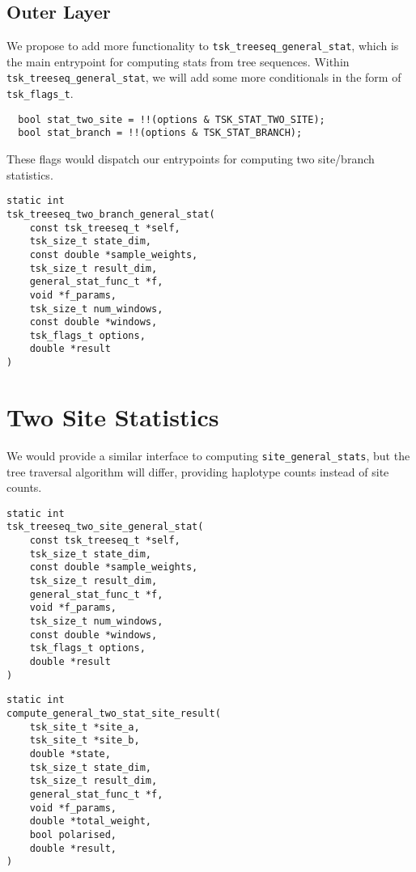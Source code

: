\documentclass[12pt]{article}
\begin{document}
\subsection{Outer Layer}

We propose to add more functionality to
\texttt{tsk_treeseq_general_stat}, which is the main entrypoint for
computing stats from tree sequences. Within
\texttt{tsk_treeseq_general_stat}, we will add some more conditionals in
the form of \texttt{tsk_flags_t}.

\begin{verbatim}
  bool stat_two_site = !!(options & TSK_STAT_TWO_SITE);
  bool stat_branch = !!(options & TSK_STAT_BRANCH);
\end{verbatim}

These flags would dispatch our entrypoints for computing two site/branch statistics.


\begin{verbatim}
static int
tsk_treeseq_two_branch_general_stat(
	const tsk_treeseq_t *self,
	tsk_size_t state_dim,
	const double *sample_weights,
	tsk_size_t result_dim,
	general_stat_func_t *f,
	void *f_params,
	tsk_size_t num_windows,
	const double *windows,
	tsk_flags_t options,
	double *result
)
\end{verbatim}


\section{Two Site Statistics}

We would provide a similar interface to computing
\texttt{site_general_stats}, but the tree traversal algorithm will
differ, providing haplotype counts instead of site counts.

\begin{verbatim}
static int
tsk_treeseq_two_site_general_stat(
	const tsk_treeseq_t *self,
	tsk_size_t state_dim,
	const double *sample_weights,
	tsk_size_t result_dim,
	general_stat_func_t *f,
	void *f_params,
	tsk_size_t num_windows,
	const double *windows,
	tsk_flags_t options,
	double *result
)
\end{verbatim}

\begin{verbatim}
static int
compute_general_two_stat_site_result(
	tsk_site_t *site_a,
	tsk_site_t *site_b,
	double *state,
	tsk_size_t state_dim,
	tsk_size_t result_dim,
	general_stat_func_t *f,
	void *f_params,
	double *total_weight,
	bool polarised,
	double *result,
)
\end{verbatim}
\end{document}
